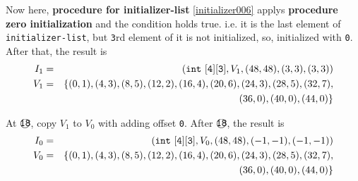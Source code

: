 \begin{Example}
Now here,  {\bf procedure for initializer-list}
 \ref{initializer006} applys {\bf procedure zero initialization}
and the condition holds true. i.e. it is the last element of
 {\tt{initializer-list}}, but {\tt{3}}rd element of it is not
 initialized, so, initialized with {\tt{0}}.
After that, the result is
\begin{eqnarray*}
I_1 & = & ({\tt{int\,\,[4][3]}},V_1,(48,48),(3,3),(3,3)) \\
V_1 & = & \{
 (0,1),(4,3),(8,5),(12,2),(16,4),(20,6),(24,3),(28,5),(32,7), \\
    &   &  (36,0), (40,0), (44,0) \}
\end{eqnarray*}

\noindent
At $\MARU{\tt 18}$, copy $V_1$ to $V_0$ with adding offset {\tt{0}}.
After $\MARU{\tt 18}$, the result is
\begin{eqnarray*}
I_0 & = & ({\tt{int\,\,[4][3]}},V_0,(48,48),(-1,-1),(-1,-1)) \\
V_0 & = & \{
 (0,1),(4,3),(8,5),(12,2),(16,4),(20,6),(24,3),(28,5),(32,7), \\
    &   &  (36,0), (40,0), (44,0) \}
\end{eqnarray*}
\end{Example}

